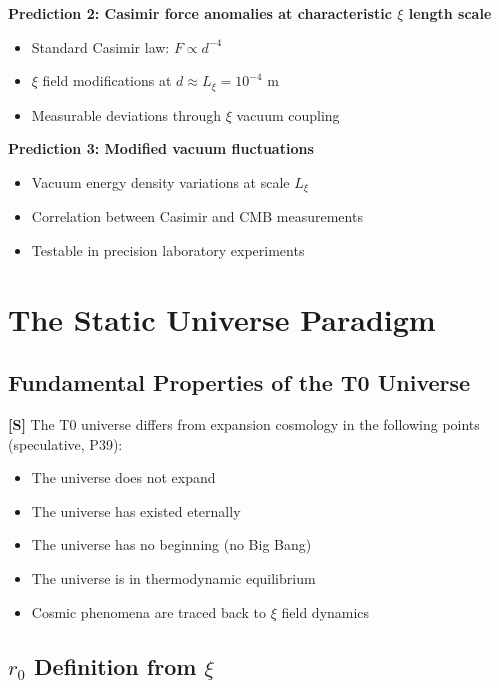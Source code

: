 	\textbf{Prediction 2: Casimir force anomalies at characteristic $\xi$ length scale}
	\begin{itemize}
		\item Standard Casimir law: $F \propto d^{-4}$
		\item $\xi$ field modifications at $d \approx L_\xi = 10^{-4}$ m
		\item Measurable deviations through $\xi$ vacuum coupling
	\end{itemize}
	
	\textbf{Prediction 3: Modified vacuum fluctuations}
	\begin{itemize}
		\item Vacuum energy density variations at scale $L_\xi$
		\item Correlation between Casimir and CMB measurements
		\item Testable in precision laboratory experiments
	\end{itemize}
	
	\section{The Static Universe Paradigm}
	
	\subsection{Fundamental Properties of the T0 Universe}
	
	\begin{important}
		\textbf{[S]} The T0 universe differs from expansion cosmology in the following points (speculative, P39):
		\begin{itemize}
			\item The universe does not expand
			\item The universe has existed eternally
			\item The universe has no beginning (no Big Bang)
			\item The universe is in thermodynamic equilibrium
			\item Cosmic phenomena are traced back to $\xi$ field dynamics
		\end{itemize}
	\end{important}
	
	\subsection{$r_0$ Definition from $\xi$}
	
